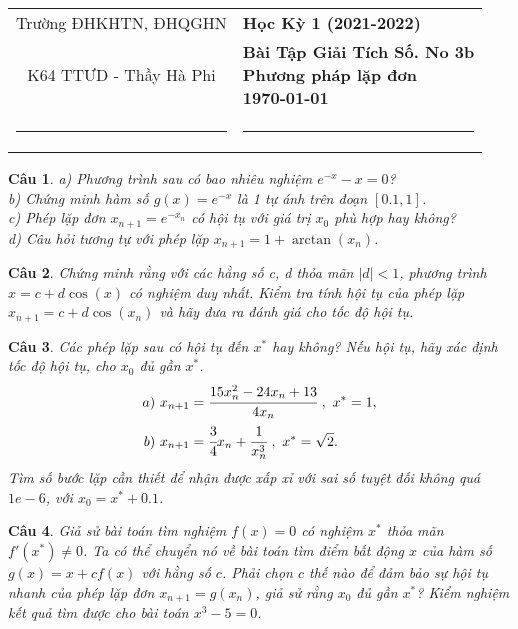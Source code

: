 \documentclass[11pt]{article}
\newtheorem{bt}{Câu}
\begin{document}
\begin{tabular*}
	{\linewidth}{c>{\centering\hspace{0pt}} p{}}
	Trường ĐHKHTN, ĐHQGHN & {\bf Học Kỳ 1 (2021-2022)}
	\tabularnewline
	K64 TTƯD - Thầy Hà Phi & {\bf Bài Tập Giải Tích Số. No 3b \\ Phương pháp lặp đơn \\ \today}
	\tabularnewline
	\rule{1in}{1pt}  \small  & \rule{2in}{1pt} %
	\tabularnewline
	
\end{tabular*}
%

\begin{bt} %
a) Phương trình sau có bao nhiêu nghiệm $e^{-x} - x  = 0 $? \\
b) Chứng minh hàm số $g(x) = e^{-x}$ là 1 tự ánh trên đoạn $[0.1,1]$. \\
c) Phép lặp đơn $x_{n+1}=e^{-x_n}$ có hội tụ với giá trị $x_0$ phù hợp hay không? \\
d) Câu hỏi tương tự với phép lặp $x_{n+1} = 1 + \arctan(x_n)$.
\end{bt}

\begin{bt} %
Chứng minh rằng với các hằng số c, d thỏa mãn $|d|<1$, phương trình $x=c+d \cos(x)$ có nghiệm duy nhất. Kiểm tra tính hội tụ của phép lặp $x_{n+1}=c+d \cos(x_n)$ và hãy đưa ra đánh giá cho tốc độ hội tụ.
\end{bt}

\begin{bt} %
Các phép lặp sau có hội tụ đến $x^*$ hay không? Nếu hội tụ, hãy xác định tốc độ hội tụ, cho $x_0$ đủ gần $x^*$.
%
\begin{align*}
a) \  x_{n+1} &= \cfrac{15 x_n^2-24x_n+13}{4x_n} \ , \ x^*=1, \\
b) \  x_{n+1} &= \cfrac{3}{4} x_n + \cfrac{1}{x_n^3} \ , \ x^*=\sqrt{2}.
\end{align*}
%
Tìm số bước lặp cần thiết để nhận được xấp xỉ với sai số tuyệt đối không quá $1e-6$, với $x_0 = x^* + 0.1$. 
\end{bt}

\begin{bt} %
Giả sử bài toán tìm nghiệm $f(x)=0$ có nghiệm $x^*$ thỏa mãn $f'(x^*)\not=0$. Ta có thể chuyển nó về bài toán tìm điểm bất động $x$ của hàm số $g(x)=x+cf(x)$ với hằng số $c$. Phải chọn $c$ thế nào để đảm bảo sự hội tụ nhanh của phép lặp đơn $x_{n+1}=g(x_n)$, giả sử rằng $x_0$ đủ gần $x^*$? Kiểm nghiệm kết quả tìm được cho bài toán $x^3-5=0$.
\end{bt}
\end{document}

